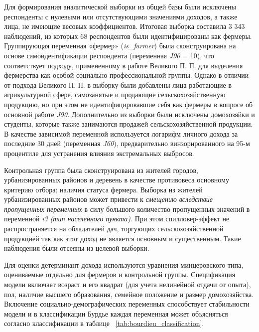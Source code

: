\documentclass[14pt, a4paper]{article}
\begin{document}
	Для формирования аналитической выборки из общей базы были исключены респонденты с нулевыми или отсутствующими значениями доходов, а также лица, не имеющие весовых коэффициентов. Итоговая выборка составила 3 343 наблюдений, из которых 68 респондентов были идентифицированы как фермеры. Группирующая переменная «фермер» (\textit{is\_farmer}) была сконструирована на основе самоидентификации респондента (переменная \textit{J90} = 10), что соответствует подходу, примененному в работе Великого П. П. \cite{velikiy2024fermerstvo} для выделения фермерства как особой социально-профессиональной группы. Однако в отличии от подхода Великого П. П. в выборку были добавлены лица работающие в агрикультурной сфере, самозанятые и продающие сельскохозяйственную продукцию, но при этом не идентифицировавшие себя как фермеры в вопросе об основной работе \textit{J90}. Дополнительно из выборки были исключены домохозяйки и студенты, которые также занимаются продажей сельскохозяйственной продукции. В качестве зависимой переменной используется логарифм личного дохода за последние 30 дней (переменная \textit{J60}), предварительно винзорированного на 95-м процентиле для устранения влияния экстремальных выбросов.
	
	Контрольная группа была сконструирована из жителей городов, урбанизированных районов и деревень в качестве противовеса основному критерию отбора: наличия статуса фермера. Выборка из жителей урбанизированных районов может привести к  \textit{смещению вследствие пропущенных переменных} в силу большого количество пропущенных значений в переменной\textit{ i3 (тип населенного пункта).} При этом спилловер-эффект не распространяется на обладателей дач, торгующих сельскохозяйственной продукцией так как этот доход не является основным и существенным. Такие наблюдения были отсеяны из целевой выборки.
	
	Для оценки детерминант дохода используются уравнения минцеровского типа, оцениваемые отдельно для фермеров и контрольной группы. Спецификация модели включает возраст и его квадрат (для учета нелинейной отдачи от опыта), пол, наличие высшего образования, семейное положение и размер домохозяйства. Включение социально-демографических переменных способствует стабильности модели и в классификации Бурдье каждая переменная может объясняться согласно классификации в таблице ~\ref{tab:bourdieu_classification}. 
	
\end{document}
